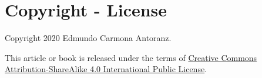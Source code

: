 
\section{Copyright - License}

Copyright 2020 Edmundo Carmona Antoranz.

This article or book is released under the terms of
\href{https://creativecommons.org/licenses/by-sa/4.0/legalcode}{Creative Commons Attribution-ShareAlike 4.0 International Public License}.
